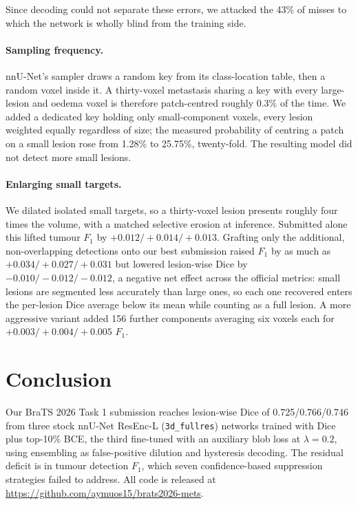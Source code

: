 \documentclass[runningheads]{llncs}
\begin{document}
Since decoding could not separate these errors, we attacked the 43\% of misses to which the
network is wholly blind from the training side.

\paragraph{Sampling frequency.} nnU-Net's sampler draws a random key from its class-location
table, then a random voxel inside it. A thirty-voxel metastasis sharing a key with every
large-lesion and oedema voxel is therefore patch-centred roughly 0.3\% of the time. We added
a dedicated key holding only small-component voxels, every lesion weighted equally regardless of
size; the measured probability of centring a patch on a small lesion rose from 1.28\% to
25.75\%, twenty-fold. The resulting model did not detect more small lesions.

\paragraph{Enlarging small targets.} We dilated isolated small targets, so a thirty-voxel lesion
presents roughly four times the volume, with a matched selective erosion at inference. Submitted
alone this lifted tumour $F_1$ by $+0.012/+0.014/+0.013$. Grafting only the additional,
non-overlapping detections onto our best submission raised $F_1$ by as much as
$+0.034/+0.027/+0.031$ but lowered lesion-wise Dice by $-0.010/-0.012/-0.012$, a negative net
effect across the official metrics: small lesions are segmented less accurately than large ones,
so each one recovered enters the per-lesion Dice average below its mean while counting as a full
lesion. A more aggressive variant added 156
further components averaging six voxels each for $+0.003/+0.004/+0.005$ $F_1$.

\section{Conclusion}
\label{sec:conclusion}

Our BraTS 2026 Task 1 submission reaches lesion-wise Dice of 0.725/0.766/0.746 from three stock
nnU-Net ResEnc-L (\texttt{3d\_fullres}) networks trained with Dice plus top-10\% BCE, the third
fine-tuned with an auxiliary blob loss at $\lambda=0.2$, using ensembling as false-positive
dilution and hysteresis decoding. The residual deficit is in tumour detection $F_1$, which seven confidence-based
suppression strategies failed to address. All code is released at \url{https://github.com/aymuos15/brats2026-mets}.
\end{document}
